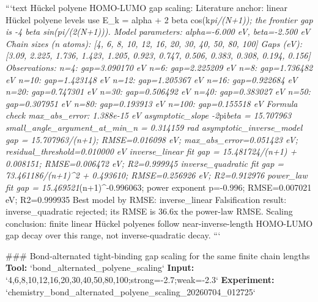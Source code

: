 \documentclass[11pt,a4paper]{article}
\begin{document}
```text
Hückel polyene HOMO-LUMO gap scaling:
  Literature anchor: linear Hückel polyene levels use E\_k = alpha + 2 beta cos(k\textit{pi/(N+1)); the frontier gap is -4 beta sin(pi/(2(N+1))).
  Model parameters: alpha=-6.000 eV, beta=-2.500 eV
  Chain sizes (n atoms): [4, 6, 8, 10, 12, 16, 20, 30, 40, 50, 80, 100]
  Gaps (eV): [3.09, 2.225, 1.736, 1.423, 1.205, 0.923, 0.747, 0.506, 0.383, 0.308, 0.194, 0.156]
  Observations:
    n=4: gap=3.090170 eV
    n=6: gap=2.225209 eV
    n=8: gap=1.736482 eV
    n=10: gap=1.423148 eV
    n=12: gap=1.205367 eV
    n=16: gap=0.922684 eV
    n=20: gap=0.747301 eV
    n=30: gap=0.506492 eV
    n=40: gap=0.383027 eV
    n=50: gap=0.307951 eV
    n=80: gap=0.193913 eV
    n=100: gap=0.155518 eV
  Formula check max\_abs\_error: 1.388e-15 eV
  asymptotic\_slope -2}pi\textit{beta = 15.707963
  small\_angle\_argument\_at\_min\_n = 0.314159 rad
  asymptotic\_inverse\_model gap = 15.707963/(n+1); RMSE=0.016098 eV; max\_abs\_error=0.051423 eV; residual\_threshold=0.010000 eV
  inverse\_linear fit gap = 15.481724/(n+1) + 0.008151; RMSE=0.006472 eV; R2=0.999945
  inverse\_quadratic fit gap = 73.461186/(n+1)\textasciicircum{}2 + 0.493610; RMSE=0.256926 eV; R2=0.912976
  power\_law fit gap = 15.469521}(n+1)\textasciicircum{}-0.996063; power exponent p=-0.996; RMSE=0.007021 eV; R2=0.999935
  Best model by RMSE: inverse\_linear
  Falsification result: inverse\_quadratic rejected; its RMSE is 36.6x the power-law RMSE.
  Scaling conclusion: finite linear Hückel polyenes follow near-inverse-length HOMO-LUMO gap decay over this range, not inverse-quadratic decay.
```

\#\#\# Bond-alternated tight-binding gap scaling for the same finite chain lengths
\textbf{Tool:} `bond\_alternated\_polyene\_scaling`
\textbf{Input:} `4,6,8,10,12,16,20,30,40,50,80,100;strong=-2.7;weak=-2.3`
\textbf{Experiment:} `chemistry\_bond\_alternated\_polyene\_scaling\_20260704\_012725`
\end{document}

